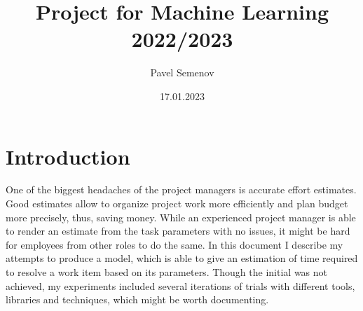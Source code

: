 \documentclass{article}
\title{Project for Machine Learning 2022/2023}
\author{Pavel Semenov}
\date{17.01.2023}
\begin{document}
\maketitle

\section{Introduction}
One of the biggest headaches of the project managers is accurate effort estimates.
Good estimates allow to organize project work more efficiently and plan budget more precisely, thus, saving money.
While an experienced project manager is able to render an estimate from the task parameters with no issues, it might
be hard for employees from other roles to do the same. In this document I describe my attempts to produce a model,
which is able to give an estimation of time required to resolve a work item based on its parameters. Though the initial
was not achieved, my experiments included several iterations of trials with different tools, libraries and techniques,
which might be worth documenting.
\end{document}
